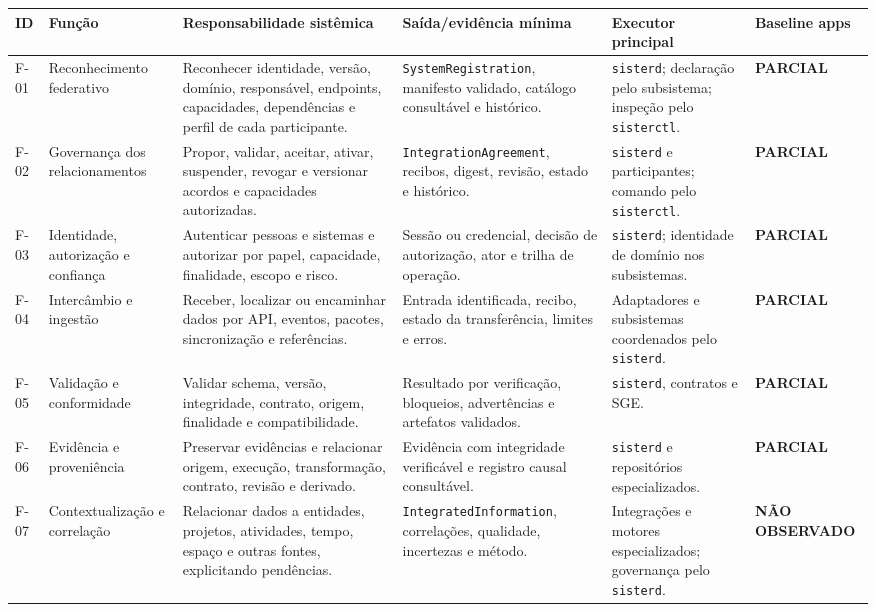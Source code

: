 \documentclass[11pt,a4paper,oneside]{article}
\newcommand{\statusparcial}{\textcolor{sisteramber}{\textbf{PARCIAL}}}
\newcommand{\statusausente}{\textcolor{sisterred}{\textbf{NÃO OBSERVADO}}}
\begin{document}
\begin{landscape}
\small
\begin{longtable}{P{1.35cm}P{3.4cm}P{6.2cm}P{4.8cm}P{3.4cm}P{2.7cm}}
\toprule
\textbf{ID} & \textbf{Função} & \textbf{Responsabilidade sistêmica} & \textbf{Saída/evidência mínima} & \textbf{Executor principal} & \textbf{Baseline apps} \\
\midrule
\endhead
F-01 & Reconhecimento federativo & Reconhecer identidade, versão, domínio, responsável, endpoints, capacidades, dependências e perfil de cada participante. & \texttt{SystemRegistration}, manifesto validado, catálogo consultável e histórico. & \texttt{sisterd}; declaração pelo subsistema; inspeção pelo \texttt{sisterctl}. & \statusparcial \\
F-02 & Governança dos relacionamentos & Propor, validar, aceitar, ativar, suspender, revogar e versionar acordos e capacidades autorizadas. & \texttt{IntegrationAgreement}, recibos, digest, revisão, estado e histórico. & \texttt{sisterd} e participantes; comando pelo \texttt{sisterctl}. & \statusparcial \\
F-03 & Identidade, autorização e confiança & Autenticar pessoas e sistemas e autorizar por papel, capacidade, finalidade, escopo e risco. & Sessão ou credencial, decisão de autorização, ator e trilha de operação. & \texttt{sisterd}; identidade de domínio nos subsistemas. & \statusparcial \\
F-04 & Intercâmbio e ingestão & Receber, localizar ou encaminhar dados por API, eventos, pacotes, sincronização e referências. & Entrada identificada, recibo, estado da transferência, limites e erros. & Adaptadores e subsistemas coordenados pelo \texttt{sisterd}. & \statusparcial \\
F-05 & Validação e conformidade & Validar schema, versão, integridade, contrato, origem, finalidade e compatibilidade. & Resultado por verificação, bloqueios, advertências e artefatos validados. & \texttt{sisterd}, contratos e SGE. & \statusparcial \\
F-06 & Evidência e proveniência & Preservar evidências e relacionar origem, execução, transformação, contrato, revisão e derivado. & Evidência com integridade verificável e registro causal consultável. & \texttt{sisterd} e repositórios especializados. & \statusparcial \\
F-07 & Contextualização e correlação & Relacionar dados a entidades, projetos, atividades, tempo, espaço e outras fontes, explicitando pendências. & \texttt{IntegratedInformation}, correlações, qualidade, incertezas e método. & Integrações e motores especializados; governança pelo \texttt{sisterd}. & \statusausente \\

\end{longtable}
\end{landscape}
\end{document}
